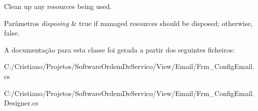 Clean up any resources being used. 


\begin{DoxyParams}{Parâmetros}
{\em disposing} & true if managed resources should be disposed; otherwise, false.\\
\hline
\end{DoxyParams}


A documentação para esta classe foi gerada a partir dos seguintes ficheiros\+:\begin{DoxyCompactItemize}
\item 
C\+:/\+Cristiano/\+Projetos/\+Software\+Ordem\+De\+Servico/\+View/\+Email/Frm\+\_\+\+Config\+Email.\+cs\item 
C\+:/\+Cristiano/\+Projetos/\+Software\+Ordem\+De\+Servico/\+View/\+Email/Frm\+\_\+\+Config\+Email.\+Designer.\+cs\end{DoxyCompactItemize}
